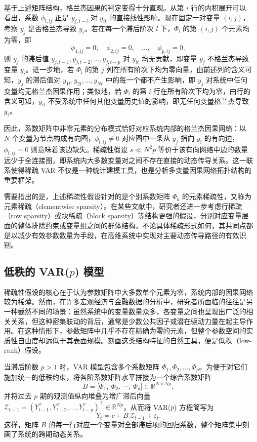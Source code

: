 基于上述矩阵结构，格兰杰因果的判定变得十分直观。从第 $i$ 行的内积展开可以看出，系数 $\phi_{l,ij}$ 正是 $y_{j,t-l}$ 对 $y_{it}$ 的直接线性影响。现在固定一对变量 $(i,j)$，考察 $y_j$ 是否格兰杰导致 $y_i$。若在每一个滞后阶次 $l$ 下，$\Phi_l$ 的第 $(i,j)$ 个元素均为零，即
\begin{equation}
\phi_{1,ij} = 0,\quad \phi_{2,ij} = 0,\quad \dots,\quad \phi_{p,ij} = 0,
\end{equation}
则 $y_j$ 的滞后值 $y_{j,t-1},y_{j,t-2},\dots,y_{j,t-p}$ 对 $y_{it}$ 均无贡献，即变量 $y_j$ 不格兰杰导致变量 $y_i$。进一步地，若 $\Phi_l$ 的第 $j$ 列在所有阶次下均为零向量，由前述列的含义可知，$y_j$ 的滞后值对 $y_{1t},y_{2t},\dots,y_{Nt}$ 中的每一个都不产生影响，即 $y_j$ 对系统中任何变量均无格兰杰因果作用；类似地，若 $\Phi_l$ 的第 $i$ 行在所有阶次下均为零，由行的含义可知，$y_{it}$ 不受系统中任何其他变量历史值的影响，即无任何变量格兰杰导致 $y_i$。

因此，系数矩阵中非零元素的分布模式恰好对应系统内部的格兰杰因果网络：以 $N$ 个变量为节点构成有向图，$\phi_{l,ij}\neq 0$ 对应图中一条从 $y_j$ 指向 $y_i$ 的有向边，$\phi_{l,ij}=0$ 则意味着该边缺失。稀疏性假设 $s\ll N^2p$ 等价于该有向网络中边的数量远少于全连接图，即系统内大多数变量对之间不存在直接的动态传导关系。这一联系使得稀疏 VAR 不仅是一种统计建模工具，也是分析多变量因果网络拓扑结构的重要框架。

需要指出的是，上述稀疏性假设针对的是个别系数矩阵 $\Phi_k$ 的元素稀疏性，又称为元素稀疏（elementwise sparsity）。在某些文献中，研究者还进一步考虑行稀疏（row sparsity）或块稀疏（block sparsity）等结构更强的假设，分别对应变量层面的整体排除约束或变量组之间的群体结构。不论具体稀疏形式如何，其共同点都是以减少有效参数数量为手段，在高维系统中实现对主要动态传导路径的有效识别。

\subsection{低秩的 \texorpdfstring{VAR($p$)}{VAR(p)} 模型}

稀疏性假设的核心在于认为参数矩阵中大多数单个元素为零，系统内部的因果网络较为稀薄。然而，在许多宏观经济与金融数据的分析中，研究者所面临的往往是另一种截然不同的场景：虽然系统中的变量数量众多，各变量之间也呈现出广泛的相关关系，但这种密集联动的背后，通常是少数公共因子或潜在驱动力量在起主导作用。在这种情形下，参数矩阵中几乎不存在精确为零的元素，但整个参数空间的实质性自由度却远低于其表面规模。刻画这类结构特征的自然工具，便是低秩（low-rank）假设。

当滞后阶数 $p>1$ 时，VAR 模型包含多个系数矩阵 $\Phi_1, \Phi_2, \dots, \Phi_p$。为便于对它们施加统一的低秩约束，将各阶系数矩阵水平拼接为一个综合系数矩阵
\begin{equation}
B = \bigl[\Phi_1,\ \Phi_2,\ \cdots,\ \Phi_p\bigr]\in\mathbb{R}^{N\times Np},
\end{equation}
并将过去 $p$ 期的观测值纵向堆叠为增广滞后向量 $\mathcal{Z}_{t-1}=(Y_{t-1}^\top,Y_{t-2}^\top,\dots,Y_{t-p}^\top)^\top\in\mathbb{R}^{Np}$，从而将 VAR($p$) 方程简写为
\begin{equation}
Y_t = c + B\,\mathcal{Z}_{t-1} + \varepsilon_t.
\end{equation}
这样，矩阵 $B$ 的每一行对应一个变量对全部滞后项的回归系数，整个矩阵集中刻画了系统的跨期动态关系。

